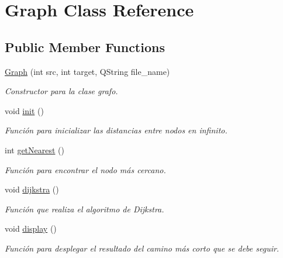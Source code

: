 \hypertarget{classGraph}{}\section{Graph Class Reference}
\label{classGraph}
\subsection*{Public Member Functions}
\begin{DoxyCompactItemize}
\item 
\hyperlink{classGraph_a659cbdfe9bf825b899b5a8c19296718e}{Graph} (int src, int target, Q\+String file\+\_\+name)
\begin{DoxyCompactList}\small\item\em Constructor para la clase grafo. \end{DoxyCompactList}\item 
\mbox{\label{classGraph_a658fb9e409aea585c61dba4792adb9ea}} 
void \hyperlink{classGraph_a658fb9e409aea585c61dba4792adb9ea}{init} ()
\begin{DoxyCompactList}\small\item\em Función para inicializar las distancias entre nodos en infinito. \end{DoxyCompactList}\item 
int \hyperlink{classGraph_ae143867923e6355ff07a9f61626a9ef6}{get\+Nearest} ()
\begin{DoxyCompactList}\small\item\em Función para encontrar el nodo más cercano. \end{DoxyCompactList}\item 
\mbox{\label{classGraph_a290dc10865625163c4d0679454a95499}} 
void \hyperlink{classGraph_a290dc10865625163c4d0679454a95499}{dijkstra} ()
\begin{DoxyCompactList}\small\item\em Función que realiza el algoritmo de Dijkstra. \end{DoxyCompactList}\item 
\mbox{\label{classGraph_afb0185b10e20bf8f8b6768c3bbd54607}} 
void \hyperlink{classGraph_afb0185b10e20bf8f8b6768c3bbd54607}{display} ()
\begin{DoxyCompactList}\small\item\em Función para desplegar el resultado del camino más corto que se debe seguir. \end{DoxyCompactList}\item 

\end{DoxyCompactItemize}
